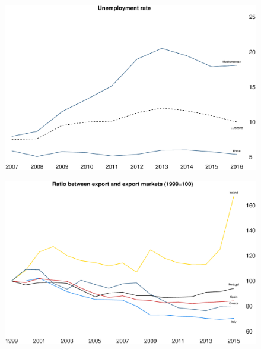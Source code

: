 \documentclass{beamer}
\begin{document}
\begin{frame}
  \begin{figure}
    \includegraphics[scale=.3]{unemployment.eps}
  \end{figure}
\end{frame}

\begin{frame}
  \begin{figure}
    \includegraphics[scale=.3]{pigs_exports.eps}
  \end{figure}
\end{frame}
\end{document}

